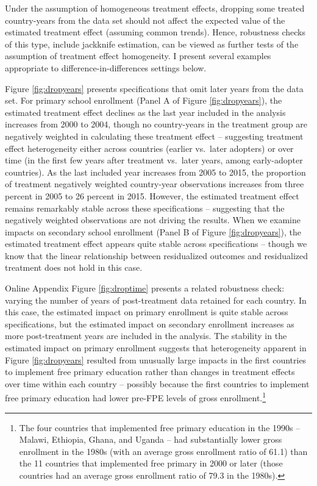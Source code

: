 \documentclass[11pt]{article}
\begin{document}
Under the assumption of homogeneous treatment effects, dropping some treated country-years from the data set should not affect the expected 
value of the estimated treatment effect (assuming common trends).  Hence, robustness checks of this type, include jackknife estimation, 
can be viewed as further tests of the assumption of treatment effect homogeneity.  I present several examples appropriate to difference-in-differences settings below.

Figure \ref{fig:dropyears} presents specifications that omit later years from the data set.  For primary school enrollment (Panel A of Figure \ref{fig:dropyears}), 
the estimated treatment effect declines as the last year included in the analysis increases from 2000 to 2004, though no country-years in the treatment group are negatively weighted in calculating these treatment effect -- suggesting treatment effect heterogeneity either across countries (earlier vs.~later adopters) or over time (in the first few years after treatment vs.~later years, among early-adopter countries).  As the last included year increases from 2005 to 2015, the proportion of treatment negatively weighted country-year observations increases from three percent in 2005 to 26 percent in 2015.  However, the estimated treatment effect remains remarkably stable across these specifications -- suggesting that the negatively weighted observations are not driving the results.  When we examine impacts on secondary school enrollment (Panel B of Figure \ref{fig:dropyears}), the estimated treatment effect appears quite stable across specifications -- though we know that the linear relationship between residualized outcomes and residualized treatment does not hold in this case.

Online Appendix Figure \ref{fig:droptime} presents a related robustness check:  varying the number of years of post-treatment data retained for each country.  In this case, the estimated impact on primary enrollment is quite stable across specifications, but the estimated impact on secondary enrollment increases as more post-treatment years are included in the analysis.  The stability in the estimated impact on primary enrollment suggests that heterogeneity apparent in Figure \ref{fig:dropyears} resulted from unusually large impacts in the first countries to implement free primary education rather than changes in treatment effects over time within each country -- possibly because the first countries to implement free primary education had lower pre-FPE levels of gross enrollment.\footnote{The four countries that implemented free primary education in the 1990s -- Malawi, Ethiopia, Ghana, and Uganda -- had substantially lower gross enrollment in the 1980s (with an average gross enrollment ratio of 61.1) than the 11 countries that implemented free primary in 2000 or later (those countries had an average gross enrollment ratio of 79.3 in the 1980s).}
\end{document}
